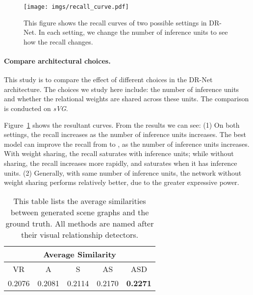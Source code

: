 \begin{figure}
    \centering
\texttt{[image: imgs/recall\_curve.pdf]}
    \caption{\small
	This figure shows the recall curves of two possible settings in DR-Net.
        In each setting, we change the number of inference units to see how the recall changes.}
    \label{fig:drnet_curve}
\end{figure}

\paragraph{Compare architectural choices.}

This study is to compare the effect of different choices in the DR-Net architecture.
The choices we study here include:
the number of inference units and whether the relational weights are shared
across these units.
The comparison is conducted on \emph{sVG}.

Figure~\ref{fig:drnet_curve} shows the resultant curves.
From the results we can see:
(1) On both settings, the recall increases as the number of inference units increases.
The best model can improve the recall from  to , as the number
of inference units increases.
With weight sharing, the recall saturates with  inference units;
while without sharing, the recall increases more rapidly, and saturates when it has  inference units.
(2) Generally, with same number of inference units,
the network without weight sharing performs relatively better,
due to the greater expressive power.




\begin{table}
    \centering
   \small
    \begin{tabular}{c|c|c|c|c}
	\toprule
	\multicolumn{5}{c}{Average Similarity} \\
	\midrule
        VR \cite{lu2016visual} & A & S & AS & ASD \\
	\hline
	    0.2076 & 0.2081 & 0.2114 & 0.2170 & \textbf{0.2271} \\
	\bottomrule
    \end{tabular}
    \caption{\small This table lists the average similarities between generated scene graphs and the ground truth.
	All methods are named after their visual relationship detectors.}
    \label{tab:sg_rst}
\end{table}

